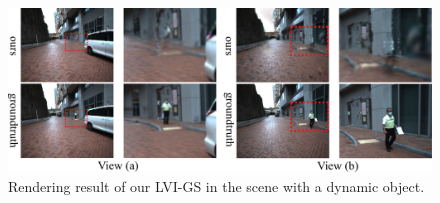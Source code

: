 \documentclass[lettersize,journal]{IEEEtran}
\begin{document}
\begin{figure}
    \centering
    \includegraphics[width=2.0\columnwidth]{image/dynamic/dynamic.pdf} %
    \caption{
      Rendering result of our LVI-GS in the scene with a dynamic object.}
    \label{fig:dynamic}
\end{figure}
\end{document}
